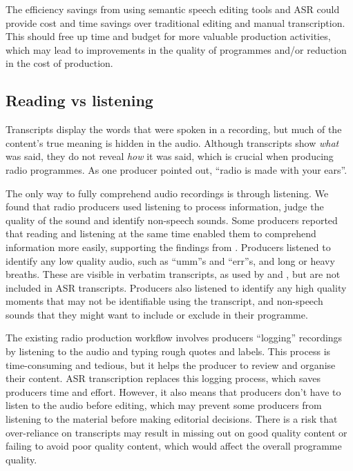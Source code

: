 
The efficiency savings from using semantic speech editing tools and ASR could provide cost and time
savings over traditional editing and manual transcription.  This should free up time and budget for more valuable
production activities, which may lead to improvements in the quality of programmes and/or reduction in the cost of
production.


\subsection{Reading vs listening}

Transcripts display the words that were spoken in a recording, but much of the content's true meaning is hidden in the
audio. Although transcripts show \textit{what} was said, they do not reveal \textit{how} it was said, which is crucial
when producing radio programmes.  As one producer pointed out, ``radio is made with your ears''.

The only way to fully comprehend audio recordings is through listening.  We found that radio producers used listening
to process information, judge the quality of the sound and identify non-speech sounds.  Some producers reported that
reading and listening at the same time enabled them to comprehend information more easily, supporting the findings from
\citet{Vemuri2004}.  Producers listened to identify any low quality audio, such as ``umm''s and ``err''s, and long or heavy
breaths. These are visible in verbatim transcripts, as used by \citet{Berthouzoz2012} and \citet{Rubin2013}, but are
not included in ASR transcripts.  Producers also listened to identify any high quality moments that may not be
identifiable using the transcript, and non-speech sounds that they might want to include or exclude in their programme.


The existing radio production workflow involves producers ``logging'' recordings by listening to the audio and typing
rough quotes and labels.  This process is time-consuming and tedious, but it helps the producer to review and organise
their content.  ASR transcription replaces this logging process, which saves producers time and effort. However, it
also means that producers don't have to listen to the audio before editing, which may prevent some producers from
listening to the material before making editorial decisions.  There is a risk that over-reliance on transcripts may
result in missing out on good quality content or failing to avoid poor quality content, which would affect the overall
programme quality.

